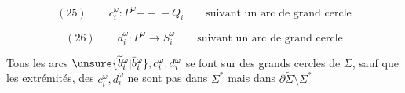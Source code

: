 \[
(25)\qquad c_i^\omega:P^\omega\mathrel{-\!\!\!-\!\!\!-}Q_i\qquad\text{suivant un arc de grand cercle}
\]

\[
(26)\qquad d_i^\omega:P^\omega\longrightarrow S_i^\omega\qquad\text{suivant un arc de grand cercle}
\]


Tous les arcs $\unsure{\widetilde b_i^\omega|\bar b_i^\omega},c_i^\omega,d_i^\omega$ se font sur des grands cercles de $\Sigma$, sauf que les extrémités, des $c_i^\omega,d_i^\omega$ ne sont pas dans $\Sigma^*$ mais dans  $\partial\widetilde\Sigma\setminus\Sigma^*$

